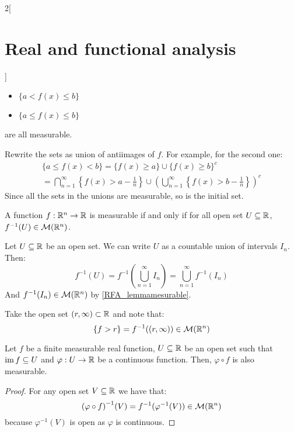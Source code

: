 \documentclass[../../../main_math.tex]{subfiles}
\begin{document}
\begin{multicols}{2}[\section{Real and functional analysis}]
\begin{lemma}
\begin{itemize}
      \item $\{a<f(x)\leq b\}$
      \item $\{a\leq f(x)\leq b\}$
    \end{itemize}
    are all measurable.
  \end{lemma}
  \begin{sproof}
    Rewrite the sets as union of antiimages of $f$. For example, for the second one:
    \begin{multline*}
      \{a\leq f(x)<b\}  =\{f(x)\geq a\}\cup{\{f(x)\geq b\}}^c                                                  \\
      =\bigcap_{n=1}^\infty \left\{f(x)>a-\frac{1}{n}\right\}\cup{\left(\bigcup_{n=1}^\infty\left\{f(x)>b-\frac{1}{n}\right\}\right)}^c
    \end{multline*}
    Since all the sets in the unions are measurable, so is the initial set.
  \end{sproof}
  \begin{proposition}
    A function $f:\mathbb{R}^n\rightarrow\mathbb{R}$ is measurable if and only if for all open set $U\subseteq \mathbb{R}$, $f^{-1}(U)\in\mathcal{M}(\mathbb{R}^n)$.
  \end{proposition}
  \begin{sproof}
    \begin{itemizeiff}
      Let $U\subseteq \mathbb{R}$ be an open set. We can write $U$ as a countable union of intervals $I_n$. Then: $$f^{-1}(U)=f^{-1}\left(\bigcup_{n=1}^\infty I_n\right)=\bigcup_{n=1}^\infty f^{-1}(I_n)$$ And $f^{-1}(I_n)\in\mathcal{M}(\mathbb{R}^n)$ by \cref{RFA_lemmamesurable}.
      \item Take the open set $(r,\infty)\subset\mathbb{R}$ and note that: $$\{f>r\}=f^{-1}((r,\infty))\in\mathcal{M}(\mathbb{R}^n)$$
    \end{itemizeiff}
  \end{sproof}
  \begin{proposition}
    Let $f$ be a finite measurable real function, $U\subseteq\mathbb{R}$ be an open set such that $\operatorname{im} f\subseteq U$ and $\varphi:U\rightarrow\mathbb{R}$ be a continuous function. Then, $\varphi\circ f$ is also measurable.
  \end{proposition}
  \begin{proof}
    For any open set $V\subseteq\mathbb{R}$ we have that: $${(\varphi\circ f)}^{-1}(V)=f^{-1}(\varphi^{-1}(V))\in\mathcal{M}(\mathbb{R}^n)$$ because $\varphi^{-1}(V)$ is open as $\varphi$ is continuous.
  \end{proof}
  \begin{proposition}\label{RFA_sumproduct}

\end{proposition}
\end{multicols}
\end{document}

